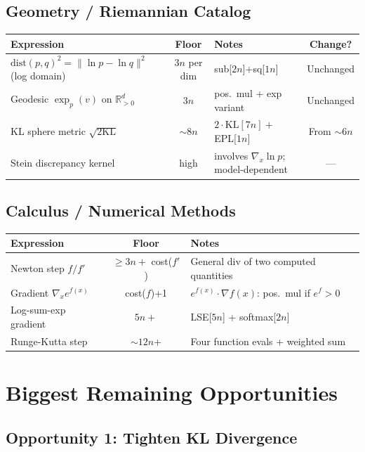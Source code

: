 \documentclass[11pt]{article}
\newcommand{\ok}[1]{\textcolor{ok}{#1}}
\newcommand{\flag}[1]{\textcolor{flag}{#1}}
\begin{document}
\subsection{Geometry / Riemannian Catalog}

\begin{center}
\begin{tabular}{lcp{4cm}c}
\toprule
Expression & Floor & Notes & Change? \\
\midrule
$\mathrm{dist}(p,q)^2 = \|\ln p - \ln q\|^2$ (log domain) & $3n$ per dim & sub[$2n$]+sq[$1n$] & \ok{Unchanged} \\
Geodesic $\exp_p(v)$ on $\mathbb{R}_{>0}^d$ & $3n$ & pos.\ mul + exp variant & \ok{Unchanged} \\
KL sphere metric $\sqrt{2\mathrm{KL}}$ & $\sim 8n$ & $2\cdot\mathrm{KL}[7n]+$ EPL[$1n$] & \flag{From $\sim 6n$} \\
Stein discrepancy kernel & high & involves $\nabla_x\ln p$; model-dependent & --- \\
\bottomrule
\end{tabular}
\end{center}

\subsection{Calculus / Numerical Methods}

\begin{center}
\begin{tabular}{lcp{5cm}}
\toprule
Expression & Floor & Notes \\
\midrule
Newton step $f/f'$ & $\geq 3n+$ cost($f'$) & General div of two computed quantities \\
Gradient $\nabla_x e^{f(x)}$ & cost($f$)+1 & $e^{f(x)} \cdot \nabla f(x)$: pos.\ mul if $e^f > 0$ \\
Log-sum-exp gradient & $5n+$ & LSE[$5n$] + softmax[$2n$] \\
Runge-Kutta step & $\sim 12n$+ & Four function evals + weighted sum \\
\bottomrule
\end{tabular}
\end{center}

\section{Biggest Remaining Opportunities}

\subsection{Opportunity 1: Tighten KL Divergence}
\end{document}
